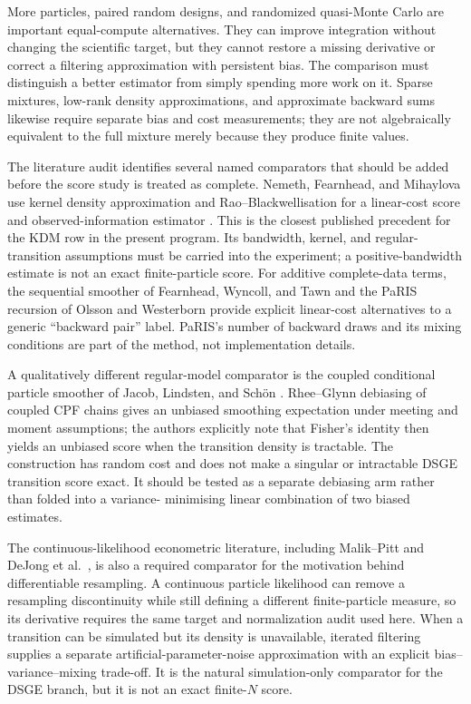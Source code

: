 \documentclass[11pt]{article}
\begin{document}
More particles, paired random designs, and randomized quasi-Monte Carlo are
important equal-compute alternatives. They can improve integration without
changing the scientific target, but they cannot restore a missing derivative
or correct a filtering approximation with persistent bias. The comparison
must distinguish a better estimator from simply spending more work on it.
Sparse mixtures, low-rank density approximations, and approximate backward
sums likewise require separate bias and cost measurements; they are not
algebraically equivalent to the full mixture merely because they produce
finite values.

The literature audit identifies several named comparators that should be added
before the score study is treated as complete. Nemeth, Fearnhead, and
Mihaylova use kernel density approximation and Rao--Blackwellisation for a
linear-cost score and observed-information estimator
\citep{nemeth2016score}. This is the closest published precedent for the KDM
row in the present program. Its bandwidth, kernel, and regular-transition
assumptions must be carried into the experiment; a positive-bandwidth estimate
is not an exact finite-particle score. For additive complete-data terms, the
sequential smoother of Fearnhead, Wyncoll, and Tawn
\citep{fearnhead2010smoothing} and the PaRIS recursion of Olsson and Westerborn
\citep{olsson2017paris} provide explicit linear-cost alternatives to a generic
``backward pair'' label. PaRIS's number of backward draws and its mixing
conditions are part of the method, not implementation details.

A qualitatively different regular-model comparator is the coupled conditional
particle smoother of Jacob, Lindsten, and Schön
\citep{jacob2020coupled}. Rhee--Glynn debiasing of coupled CPF chains gives an
unbiased smoothing expectation under meeting and moment assumptions; the
authors explicitly note that Fisher's identity then yields an unbiased score
when the transition density is tractable. The construction has random cost and
does not make a singular or intractable DSGE transition score exact. It should
be tested as a separate debiasing arm rather than folded into a variance-
minimising linear combination of two biased estimates.

The continuous-likelihood econometric literature, including Malik--Pitt and
DeJong et al.\ \citep{malik2011continuous,dejong2013efficient}, is also a
required comparator for the motivation behind differentiable resampling. A
continuous particle likelihood can remove a resampling discontinuity while
still defining a different finite-particle measure, so its derivative requires
the same target and normalization audit used here. When a transition can be
simulated but its density is unavailable, iterated filtering
\citep{ionides2011iterated} supplies a separate artificial-parameter-noise
approximation with an explicit bias--variance--mixing trade-off. It is the
natural simulation-only comparator for the DSGE branch, but it is not an exact
finite-$N$ score.
\end{document}
